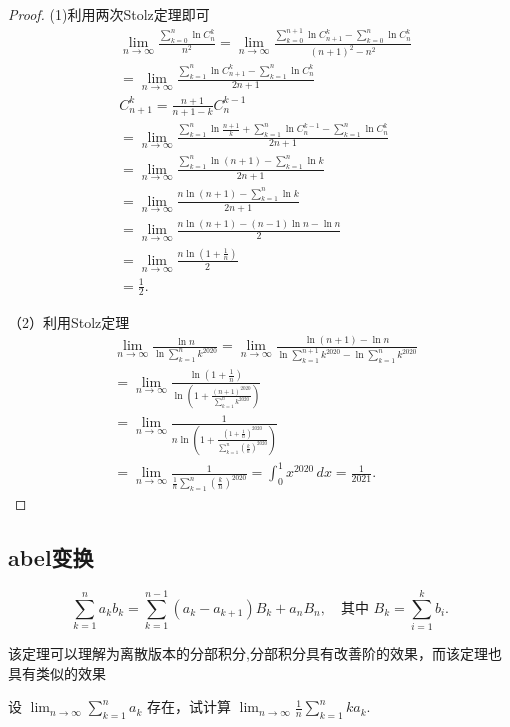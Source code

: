 \documentclass[lang=cn,10pt,thmcnt=section]{elegantbook}
\begin{document}
\begin{proof}
	(1)利用两次Stolz定理即可
	\begin{align*}
		&\lim_{n \to \infty} \frac{\sum_{k=0}^n \ln C_n^k}{n^2} = \lim_{n \to \infty} \frac{\sum_{k=0}^{n+1} \ln C_{n+1}^k - \sum_{k=0}^n \ln C_n^k}{(n+1)^2 - n^2} \\
		&= \lim_{n \to \infty} \frac{\sum_{k=1}^n \ln C_{n+1}^k - \sum_{k=1}^n \ln C_n^k}{2n+1} \\
		&C_{n+1}^k = \frac{n+1}{n+1-k} C_n^{k-1} \\
		&= \lim_{n \to \infty} \frac{\sum_{k=1}^n \ln \frac{n+1}{k} + \sum_{k=1}^n \ln C_n^{k-1} - \sum_{k=1}^n \ln C_n^k}{2n+1} \\
		&= \lim_{n \to \infty} \frac{\sum_{k=1}^n \ln (n+1) - \sum_{k=1}^n \ln k}{2n+1} \\
		&= \lim_{n \to \infty} \frac{n \ln (n+1) - \sum_{k=1}^n \ln k}{2n+1} \\
		&= \lim_{n \to \infty} \frac{n \ln (n+1) - (n-1) \ln n - \ln n}{2} \\
		&= \lim_{n \to \infty} \frac{n \ln \left(1 + \frac{1}{n}\right)}{2} \\
		&= \frac{1}{2}.
	\end{align*}
	
	（2）利用Stolz定理
	\begin{align*}
		&\lim_{n \to \infty} \frac{\ln n}{\ln \sum_{k=1}^n k^{2020}} = \lim_{n \to \infty} \frac{\ln (n+1) - \ln n}{\ln \sum_{k=1}^{n+1} k^{2020} - \ln \sum_{k=1}^n k^{2020}} \\
		&= \lim_{n \to \infty} \frac{\ln \left(1 + \frac{1}{n}\right)}{\ln \left(1 + \frac{(n+1)^{2020}}{\sum_{k=1}^n k^{2020}}\right)} \\
		&= \lim_{n \to \infty} \frac{1}{n \ln \left(1 + \frac{(1+\frac{1}{n})^{2020}}{\sum_{k=1}^n \left(\frac{k}{n}\right)^{2020}}\right)} \\
		&= \lim_{n \to \infty} \frac{1}{\frac{1}{n} \sum_{k=1}^n \left(\frac{k}{n}\right)^{2020}} = \int_0^1 x^{2020} \, dx = \frac{1}{2021}.
		\end{align*}
	
\end{proof}
\subsection{abel变换}
\begin{theorem}
	\[
\sum_{k=1}^n a_k b_k = \sum_{k=1}^{n-1} (a_k - a_{k+1}) B_k + a_n B_n, \quad \text{其中 } B_k = \sum_{i=1}^k b_i.
\]
\end{theorem}
\begin{remark}
	该定理可以理解为离散版本的分部积分,分部积分具有改善阶的效果，而该定理也具有类似的效果
\end{remark}
\begin{example}
	设 $\lim_{n \to \infty} \sum_{k=1}^n a_k$ 存在，试计算 $\lim_{n \to \infty} \frac{1}{n} \sum_{k=1}^n k a_k$.
\end{example}
\end{document}
